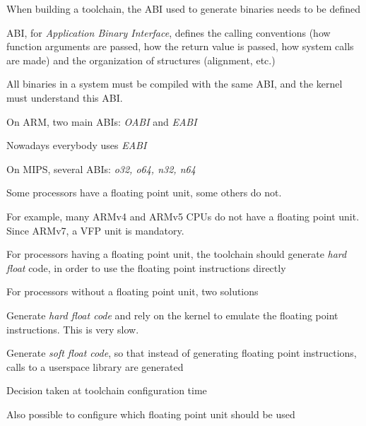   \startitemize
  \item When building a toolchain, the ABI used to generate binaries
    needs to be defined
  \item ABI, for {\em Application Binary Interface}, defines the
    calling conventions (how function arguments are passed, how the
    return value is passed, how system calls are made) and the
    organization of structures (alignment, etc.)
  \item All binaries in a system must be compiled with the same ABI,
    and the kernel must understand this ABI.
  \item On ARM, two main ABIs: {\em OABI} and {\em EABI}
    \startitemize
    \item Nowadays everybody uses {\em EABI}
    \stopitemize
  \item On MIPS, several ABIs: {\em o32, o64, n32, n64}
  \item {}
  \stopitemize

  \startitemize
  \item Some processors have a floating point unit, some others do not.
    \startitemize
    \item For example, many ARMv4 and ARMv5 CPUs do not have a
      floating point unit.  Since ARMv7, a VFP unit is mandatory.
    \stopitemize
  \item For processors having a floating point unit, the toolchain
    should generate {\em hard float} code, in order to use the
    floating point instructions directly
  \item For processors without a floating point unit, two solutions
    \startitemize
    \item Generate {\em hard float code} and rely on the kernel to
      emulate the floating point instructions. This is very slow.
    \item Generate {\em soft float code}, so that instead of
      generating floating point instructions, calls to a userspace
      library are generated
    \stopitemize
  \item Decision taken at toolchain configuration time
  \item Also possible to configure which floating point unit should be used
  \stopitemize

